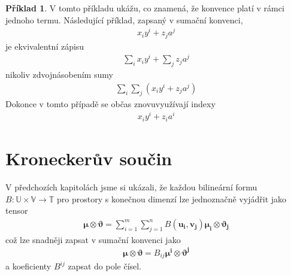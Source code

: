 \documentclass[a5paper,12pt]{amsbook}
\theoremstyle{definition}
\newtheorem{example}{Příklad}[chapter]
\newcommand{\myvec}[1]{\bm{#1}}
\newcommand{\myspace}[1]{\mathbb{#1}}
\begin{document}
\begin{example}
V tomto příkladu ukážu, co znamená, že konvence platí v rámci jednoho termu. Následující příklad,
zapsaný v sumační konvenci,
\begin{equation*}
\begin{split}
x_i y^i + z_j a^j
\end{split}
\end{equation*}
je ekvivalentní zápisu
\begin{equation*}
\begin{split}
\sum_{i} x_i y^i + \sum_{j} z_j a^j
\end{split}
\end{equation*}
nikoliv zdvojnásobením sumy
\begin{equation*}
\begin{split}
\sum_{i}\sum_{j}\left(x_i y^i +  z_j a^j\right)
\end{split}
\end{equation*}
Dokonce v tomto případě se občas znovuvyužívají indexy
\begin{equation*}
\begin{split}
x_i y^i + z_i a^i
\end{split}
\end{equation*}
\end{example}

\section{Kroneckerův součin}

\noindent
V předchozích kapitolách jsme si ukázali, že každou bilineární formu
$B:\myspace{U}\times\myspace{V}\rightarrow\myspace{T}$ pro prostory
s konečnou dimenzí lze jednoznačně vyjádřit jako tensor
\begin{equation*}
\begin{split}
\myvec{\mu}\otimes\myvec{\vartheta} 
= \sum_{i=1}^{m}\sum_{j=1}^{n}B(\myvec{u_i}, \myvec{v_j})\myvec{\mu_i}\otimes\myvec{\vartheta_j}
\end{split}
\end{equation*}
což lze snadněji zapsat v sumační konvenci jako
\begin{equation*}
\begin{split}
\myvec{\mu}\otimes\myvec{\vartheta} = B_{ij}\myvec{\mu^i}\otimes\myvec{\vartheta^j}
\end{split}
\end{equation*}
a koeficienty $B^{ij}$ zapsat do pole čísel.
\end{document}
